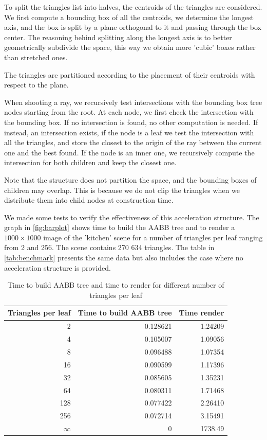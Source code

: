 \documentclass[tikz,14pt,fleqn]{article}
\begin{document}
To split the triangles list into halves, the centroids of the triangles are considered. We first compute a bounding box of all the centroids, we determine the longest axis, and the box is split by a plane orthogonal to it and passing through the box center.
The reasoning behind splitting along the longest axis is to better geometrically subdivide the space, this way we obtain more 'cubic' boxes rather than stretched ones.

The triangles are partitioned according to the placement of their centroids with respect to the plane.

When shooting a ray, we recursively test intersections with the bounding box tree nodes starting from the root. At each node, we first check the intersection with the bounding box. If no intersection is found, no other computation is needed. If instead, an intersection exists, if the node is a leaf we test the intersection with all the triangles, and store the closest to the origin of the ray between the current one and the best found. If the node is an inner one, we recursively compute the intersection for both children and keep the closest one. 

Note that the structure does not partition the space, and the bounding boxes of children may overlap. This is because we do not clip the triangles when we distribute them into child nodes at construction time. 


We made some tests to verify the effectiveness of this acceleration structure. The graph in \autoref{fig:barplot} shows time to build the AABB tree and to render a $1000\times 1000$ image of the 'kitchen' scene for a number of triangles per leaf ranging from 2 and 256. The scene contains 270 634 triangles. The table in \autoref{tab:benchmark} presents the same data but also includes the case where no acceleration structure is provided.

\begin{table}[H]
    \centering
    \begin{tabular}{|r|r|r|}
        \hline
        \textbf{Triangles per leaf} & \textbf{Time to build AABB tree} & \textbf{Time render}\\
        \hline
        2 & 0.128621 & 1.24209  \\
        4 & 0.105007 & 1.09056 \\
        8 & 0.096488 & 1.07354 \\
        16 & 0.090599 & 1.17396 \\
        32 & 0.085605 & 1.35231 \\
        64 & 0.080311 & 1.71468 \\
        128 & 0.077422 & 2.26410 \\
        256 & 0.072714 & 3.15491 \\
        $\infty$ & 0		   & 1738.49 \\
        \hline
    \end{tabular}
    \caption{Time to build AABB tree and time to render for different number of triangles per leaf}
    \label{tab:benchmark}
\end{table}
\end{document}
